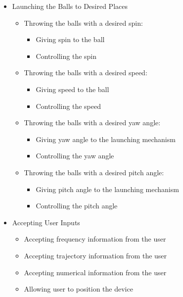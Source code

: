 \documentclass[12pt]{article}
\begin{document}
\begin{itemize}
    \item Launching the Balls to Desired Places
    \begin{itemize}
        \item Throwing the balls with a desired spin:
        \begin{itemize}
            \item Giving spin to the ball
            \item Controlling the spin
        \end{itemize}
        \item Throwing the balls with a desired speed:
        \begin{itemize}
            \item Giving speed to the ball
            \item Controlling the speed
        \end{itemize}
        \item Throwing the balls with a desired yaw angle:
        \begin{itemize}
            \item Giving yaw angle to the launching mechanism
            \item Controlling the yaw angle
        \end{itemize}
        \item Throwing the balls with a desired pitch angle:
        \begin{itemize}
            \item Giving pitch angle to the launching mechanism
            \item Controlling the pitch angle
        \end{itemize}
    \end{itemize}

    \item Accepting User Inputs
    \begin{itemize}
        \item Accepting frequency information from the user
        \item Accepting trajectory information from the user
        \item Accepting numerical information from the user
        \item Allowing user to position the device
    \end{itemize}


\end{itemize}
\end{document}
